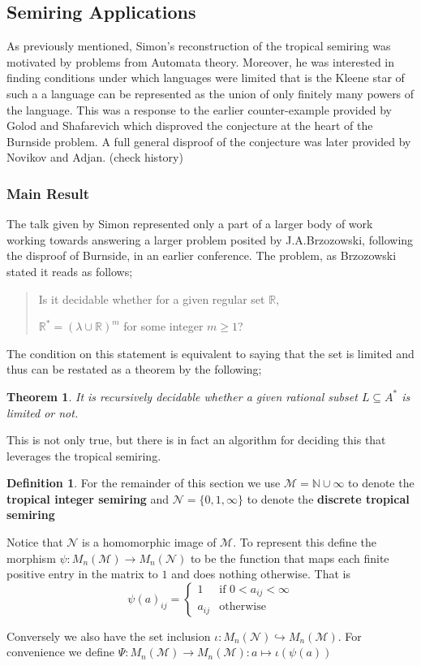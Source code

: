 \documentclass[12pt,a4paper]{amsart}
\newcommand{\N}{\mathbb{N}}
\newcommand{\R}{\mathbb{R}}
\newcommand{\TM}{\mathcal{M}}
\newcommand{\TN}{\mathcal{N}}
\newtheorem{thm}{Theorem}[section]
\theoremstyle{definition}
\newtheorem{defn}{Definition}[section]
\theoremstyle{remark}
\begin{document}
\subsection{Semiring Applications}
As previously mentioned, Simon's reconstruction of the tropical semiring was motivated by problems from Automata theory. Moreover, he was interested in finding conditions under which languages were limited that is the Kleene star of such a a language can be represented as the union of only finitely many powers of the language. This was a response to the earlier counter-example provided by Golod and Shafarevich which disproved the conjecture at the heart of the Burnside problem. A full general disproof of the conjecture was later provided by Novikov and Adjan. (check history)

\subsubsection{Main Result}
The talk given by Simon represented only a part of a larger body of work working towards answering a larger problem posited by J.A.Brzozowski, following the disproof of Burnside, in an earlier conference. The problem, as Brzozowski stated it reads as follows;
\begin{quote}
    Is it decidable whether for a given regular set $\R$,
    
    \noindent$\R^*=(\lambda\cup\R)^m$ for some integer $m\geq1$?
\end{quote}
The condition on this statement is equivalent to saying that the set is limited and thus can be restated as a theorem by the following;
\begin{thm}
It is recursively decidable whether a given rational subset $L\subseteq A^*$ is limited or not.
\end{thm}
This is not only true, but there is in fact an algorithm for deciding this that leverages the tropical semiring. 

\begin{defn}
For the remainder of this section we use $\TM=\N\cup\infty$ to denote the \textbf{tropical integer semiring} and $\TN = \{ 0,1,\infty \}$ to denote the \textbf{discrete tropical semiring}

Notice that $\TN$ is a homomorphic image of $\TM$. To represent this define the morphism $\psi:M_n(\TM)\to M_n(\TN)$ to be the function that maps each finite positive entry in the matrix to $1$ and does nothing otherwise. That is
\begin{equation}
    \psi(a)_{ij} = \begin{cases}
    1&\text{if } 0 < a_{ij} < \infty\\
    a_{ij}&\text{otherwise}
    \end{cases}
\end{equation}

Conversely we also have the set inclusion $\iota:M_n(\TN)\hookrightarrow M_n(\TM)$.
For convenience we define $\Psi:M_n(\TM)\to M_n(\TM): a\mapsto \iota(\psi(a))$ 
\end{defn}
\end{document}
